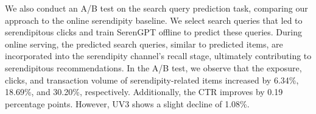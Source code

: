 \begin{table}[h]

    \caption{Performance on search query prediction task.}
    \vspace{-8pt}
    \centering
\label{tab:overall_search}
\vspace{-8pt}
\end{table}

We also conduct an A/B test on the search query prediction task, comparing our approach to the online serendipity baseline. We select search queries that led to serendipitous clicks and train SerenGPT offline to predict these queries. During online serving, the predicted search queries, similar to predicted items, are incorporated into the serendipity channel’s recall stage, ultimately contributing to serendipitous recommendations. In the A/B test, we observe that the exposure, clicks, and transaction volume of serendipity-related items increased by 6.34\%, 18.69\%, and 30.20\%, respectively. Additionally, the CTR improves by 0.19 percentage points. However, UV3 shows a slight decline of 1.08\%.

